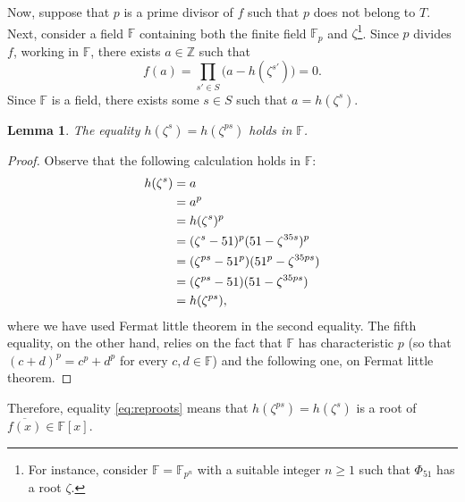 \documentclass[a4paper, 12pt]{article}
\newtheorem{lemma}[theorem]{Lemma}
\theoremstyle{definition}
\newcommand{\Z}{\ensuremath{\mathbb{Z}}}
\newcommand{\F}{\ensuremath{\mathbb{F}}}
\begin{document}
Now, suppose that $p$ is a prime divisor of $f$ such that $p$ does not belong to $T$. Next, consider a field $\F$ containing both the finite field $\F_p$ and $\zeta$\footnote{For instance, consider $\F=\F_{p^n}$ with a suitable integer $n\geqslant 1$ such that $\Phi_{51}$ has a root $\zeta$.}. Since $p$ divides $f$, working in $\F$, there exists $a\in\Z$ such that 
\begin{equation*}
f(a)=\prod_{s'\in S}\big(a-h(\zeta^{s'})\big)=0.
\end{equation*}
Since $\F$ is a field, there exists some $s\in S$ such that $a=h(\zeta^{s})$.
\begin{lemma}
The equality $h(\zeta^s)=h(\zeta^{ps})$ holds in $\F$.
\end{lemma}
\begin{proof}
 Observe that the following calculation holds in $\F$:
\begin{align}\label{eq:reproots}
h(\zeta^{s})&=a\notag \\ 
&=a^p\notag \\ 
&=h(\zeta^{s})^p\notag \\ 
&=(\zeta^{s}-51)^p(51-\zeta^{35s})^p\notag \\ 
&=(\zeta^{ps}-51^p)(51^p-\zeta^{35ps})\notag \\ 
&=(\zeta^{ps}-51)(51-\zeta^{35ps})\notag \\ 
&=h(\zeta^{ps}),
\end{align}
where we have used Fermat little theorem in the second equality. The fifth equality, on the other hand, relies on the fact that $\F$ has characteristic $p$ (so that $(c+d)^p=c^p+d^p$ for every $c,d \in \F$) and the following one, on Fermat little theorem.
\end{proof}

Therefore, equality \eqref{eq:reproots} means that $h(\zeta^{ps})=h(\zeta^{s})$ is a root of $\overline{f(x)}\in\F[x]$. 
\end{document}
